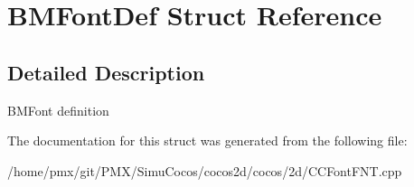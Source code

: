 \hypertarget{structBMFontDef}{}\section{B\+M\+Font\+Def Struct Reference}
\label{structBMFontDef}


\subsection{Detailed Description}
B\+M\+Font definition 

The documentation for this struct was generated from the following file\+:\begin{DoxyCompactItemize}
\item 
/home/pmx/git/\+P\+M\+X/\+Simu\+Cocos/cocos2d/cocos/2d/C\+C\+Font\+F\+N\+T.\+cpp\end{DoxyCompactItemize}
